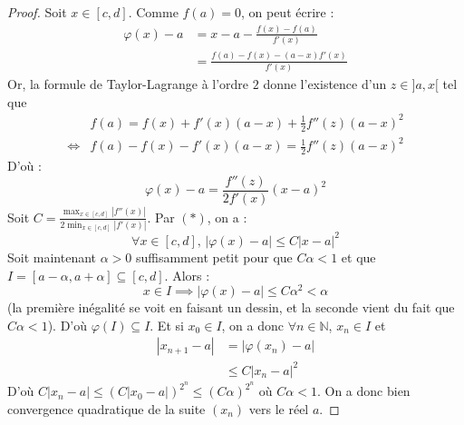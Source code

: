   \begin{proof}
    Soit $x \in [c, d]$. Comme $f(a) = 0$, on peut écrire :
    \begin{align*}
      \varphi(x) - a &= x - a - \frac{f(x) - f(a)}{f'(x)} \\
      &= \frac{f(a) - f(x) - (a-x)f'(x)}{f'(x)}
    \end{align*}
    Or, la formule de Taylor-Lagrange à l'ordre $2$ donne l'existence d'un $z \in ]a, x[$ tel que
    \begin{align*}
      &f(a) = f(x) + f'(x)(a-x) + \frac{1}{2} f''(z)(a-x)^2 \\
      \iff& f(a) - f(x) - f'(x)(a-x)  = \frac{1}{2} f''(z)(a-x)^2
    \end{align*}
    D'où :
    \[ \varphi(x) - a = \frac{f''(z)}{2f'(x)}(x-a)^2 \tag{$*$} \]
    Soit $C = \frac{\max_{x \in [c, d]} |f''(x)|}{2\min_{x \in [c, d]} |f'(x)|}$. Par $(*)$, on a :
    \[ \forall x \in [c, d], \, |\varphi(x)-a| \leq C |x-a|^2 \]
    Soit maintenant $\alpha > 0$ suffisamment petit pour que $C\alpha < 1$ et que $I = [a - \alpha, a + \alpha] \subseteq [c, d]$. Alors :
    \[ x \in I \implies |\varphi(x) - a| \leq C\alpha^2 < \alpha \]
    (la première inégalité se voit en faisant un dessin, et la seconde vient du fait que $C\alpha < 1$). D'où $\varphi(I) \subseteq I$. Et si $x_0 \in I$, on a donc $\forall n \in \mathbb{N}$, $x_n \in I$ et
    \begin{align*}
      |x_{n+1} - a| &= |\varphi(x_n) - a| \\
      &\leq C |x_n - a|^2
    \end{align*}
    D'où $C |x_n - a| \leq (C |x_0 - a|)^{2^n} \leq (C \alpha)^{2^n}$ où $C \alpha < 1$. On a donc bien convergence quadratique de la suite $(x_n)$ vers le réel $a$.
  \end{proof}


